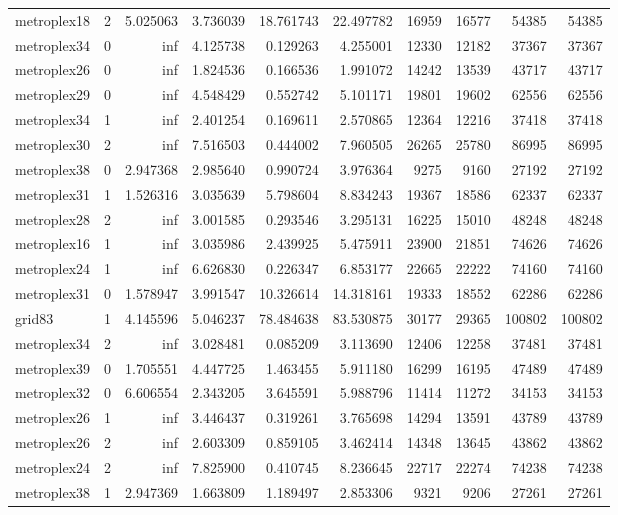 \begin{longtable}{|l|r|r|r|r|r|r|r|r|r|}
metroplex18 & 2 & 5.025063 & 3.736039 & 18.761743 & 22.497782 & 16959 & 16577 & 54385 & 54385 \\
metroplex34 & 0 & inf & 4.125738 & 0.129263 & 4.255001 & 12330 & 12182 & 37367 & 37367 \\
metroplex26 & 0 & inf & 1.824536 & 0.166536 & 1.991072 & 14242 & 13539 & 43717 & 43717 \\
metroplex29 & 0 & inf & 4.548429 & 0.552742 & 5.101171 & 19801 & 19602 & 62556 & 62556 \\
metroplex34 & 1 & inf & 2.401254 & 0.169611 & 2.570865 & 12364 & 12216 & 37418 & 37418 \\
metroplex30 & 2 & inf & 7.516503 & 0.444002 & 7.960505 & 26265 & 25780 & 86995 & 86995 \\
metroplex38 & 0 & 2.947368 & 2.985640 & 0.990724 & 3.976364 & 9275 & 9160 & 27192 & 27192 \\
metroplex31 & 1 & 1.526316 & 3.035639 & 5.798604 & 8.834243 & 19367 & 18586 & 62337 & 62337 \\
metroplex28 & 2 & inf & 3.001585 & 0.293546 & 3.295131 & 16225 & 15010 & 48248 & 48248 \\
metroplex16 & 1 & inf & 3.035986 & 2.439925 & 5.475911 & 23900 & 21851 & 74626 & 74626 \\
metroplex24 & 1 & inf & 6.626830 & 0.226347 & 6.853177 & 22665 & 22222 & 74160 & 74160 \\
metroplex31 & 0 & 1.578947 & 3.991547 & 10.326614 & 14.318161 & 19333 & 18552 & 62286 & 62286 \\
grid83 & 1 & 4.145596 & 5.046237 & 78.484638 & 83.530875 & 30177 & 29365 & 100802 & 100802 \\
metroplex34 & 2 & inf & 3.028481 & 0.085209 & 3.113690 & 12406 & 12258 & 37481 & 37481 \\
metroplex39 & 0 & 1.705551 & 4.447725 & 1.463455 & 5.911180 & 16299 & 16195 & 47489 & 47489 \\
metroplex32 & 0 & 6.606554 & 2.343205 & 3.645591 & 5.988796 & 11414 & 11272 & 34153 & 34153 \\
metroplex26 & 1 & inf & 3.446437 & 0.319261 & 3.765698 & 14294 & 13591 & 43789 & 43789 \\
metroplex26 & 2 & inf & 2.603309 & 0.859105 & 3.462414 & 14348 & 13645 & 43862 & 43862 \\
metroplex24 & 2 & inf & 7.825900 & 0.410745 & 8.236645 & 22717 & 22274 & 74238 & 74238 \\
metroplex38 & 1 & 2.947369 & 1.663809 & 1.189497 & 2.853306 & 9321 & 9206 & 27261 & 27261 \\

\end{longtable}
